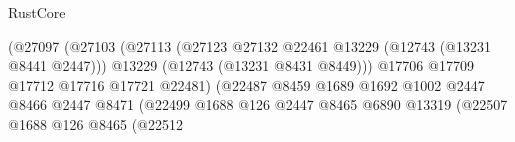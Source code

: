 \begin{lexlean}{RustCore}
\begin{coremodule}
                                                          (@27097
                                                            (@27103
                                                              (@27113
                                                                (@27123
                                                                  @27132
                                                                  @22461
                                                                  @13229
                                                                  (@12743 (@13231 @8441 @2447)))
                                                                @13229
                                                                (@12743 (@13231 @8431 @8449)))
                                                              @17706
                                                              @17709
                                                              @17712
                                                              @17716
                                                              @17721
                                                              @22481)
                                                            (@22487
                                                              @8459
                                                              @1689
                                                              @1692
                                                              @1002
                                                              @2447
                                                              @8466
                                                              @2447
                                                              @8471
                                                              (@22499
                                                                @1688
                                                                @126
                                                                @2447
                                                                @8465
                                                                @6890
                                                                @13319
                                                                (@22507
                                                                  @1688
                                                                  @126
                                                                  @8465
                                                                  (@22512

\end{coremodule}
\end{lexlean}
